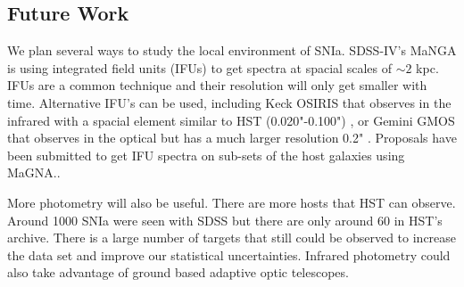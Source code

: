 \documentclass[apj, iop]{emulateapj}
\newcommand{\sn}{SNIa}
\begin{document}


\subsection{Future Work}\label{future-work-1}

We plan several ways to study the local environment of SNIa. SDSS-IV's MaNGA is using integrated
field units (IFUs) to get spectra at spacial scales of $\sim 2$ kpc. IFUs are a
common technique and their resolution will only get smaller with time.
Alternative IFU's can be used, including Keck OSIRIS that observes in the
infrared with a spacial element similar to HST (0.020"-0.100") \citep{OSIRIS},
or Gemini GMOS that observes in
the optical but has a much larger resolution 0.2" \citep{Gemini}.
Proposals have been submitted to 
get IFU spectra on sub-sets of the host galaxies using MaGNA..


More photometry will also be useful. There are more hosts that HST can observe.
Around 1000 \sn{} were seen with SDSS \citep{Campbell13} but there are only
around 60 in HST's archive. There is a large number of targets that still could be
observed to increase the data set and improve our statistical uncertainties.
Infrared photometry could also take advantage of ground based adaptive optic
telescopes.






\end{document}
